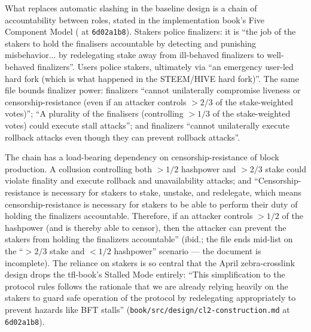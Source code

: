 \documentclass[11pt,a4paper]{article}
\theoremstyle{definition}
\begin{document}
What replaces automatic slashing in the baseline design is a chain of
accountability between roles, stated in the implementation book's Five
Component Model
( at \texttt{6d02a1b8}).
Stakers police finalizers: it is ``the job of the stakers to hold the
finalisers accountable by detecting and punishing misbehavior... by
redelegating stake away from ill-behaved finalizers to well-behaved
finalizers''. Users police stakers, ultimately via ``an emergency
user-led hard fork (which is what happened in the STEEM/HIVE hard
fork)''. The same file bounds finalizer power: finalizers ``cannot
unilaterally compromise liveness or censorship-resistance (even if an
attacker controls $>2/3$ of the stake-weighted votes)''; ``A plurality of
the finalisers (controlling $>1/3$ of the stake-weighted votes) could
execute stall attacks''; and finalizers ``cannot unilaterally execute
rollback attacks even though they can prevent rollback attacks''.

The chain has a load-bearing dependency on censorship-resistance of block
production. A collusion controlling both $>1/2$ hashpower and $>2/3$
stake could violate finality and execute rollback and unavailability
attacks; and ``Censorship-resistance is necessary for stakers to stake,
unstake, and redelegate, which means censorship-resistance is necessary
for stakers to be able to perform their duty of holding the finalizers
accountable. Therefore, if an attacker controls $>1/2$ of the hashpower
(and is thereby able to censor), then the attacker can prevent the
stakers from holding the finalizers accountable'' (ibid.; the file ends
mid-list on the ``$>2/3$ stake and $<1/2$ hashpower'' scenario --- the
document is incomplete). The reliance on stakers is so central that the
April zebra-crosslink design drops the tfl-book's Stalled Mode entirely: ``This
simplification to the protocol rules follows the rationale that we are
already relying heavily on the stakers to guard safe operation of the
protocol by redelegating appropriately to prevent hazards like BFT
stalls'' (\texttt{book/src/design/cl2-construction.md} at
\texttt{6d02a1b8}).
\end{document}

